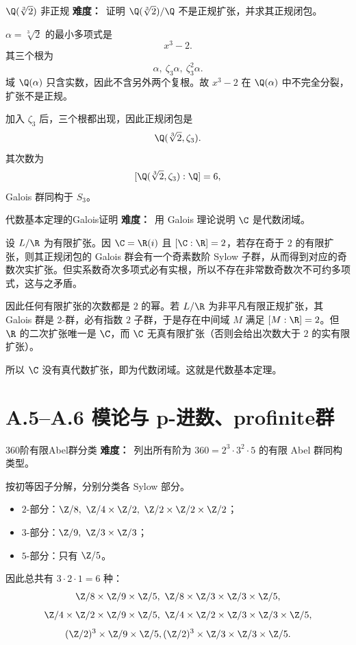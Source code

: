 \begin{problem}{$\Q(\sqrt[3]{2})$ 非正规}
\textbf{难度：}\hard\ 证明 $\Q(\sqrt[3]{2})/\Q$ 不是正规扩张，并求其正规闭包。
\end{problem}
\begin{solution}
$\alpha=\sqrt[3]{2}$ 的最小多项式是
\[
x^3-2.
\]
其三个根为
\[
\alpha,\ \zeta_3\alpha,\ \zeta_3^2\alpha.
\]
域 $\Q(\alpha)$ 只含实数，因此不含另外两个复根。故 $x^3-2$ 在 $\Q(\alpha)$ 中不完全分裂，扩张不是正规。

加入 $\zeta_3$ 后，三个根都出现，因此正规闭包是
\[
\Q(\sqrt[3]{2},\zeta_3).
\]
其次数为
\[
[\Q(\sqrt[3]{2},\zeta_3):\Q]=6,
\]
Galois 群同构于 $S_3$。
\end{solution}

\begin{problem}{代数基本定理的Galois证明}
\textbf{难度：}\hard\ 用 Galois 理论说明 $\C$ 是代数闭域。
\end{problem}
\begin{solution}
设 $L/\R$ 为有限扩张。因 $\C=\R(i)$ 且 $[\C:\R]=2$，若存在奇于 $2$ 的有限扩张，则其正规闭包的 Galois 群会有一个奇素数阶 Sylow 子群，从而得到对应的奇数次实扩张。但实系数奇次多项式必有实根，所以不存在非常数奇数次不可约多项式，这与之矛盾。

因此任何有限扩张的次数都是 $2$ 的幂。若 $L/\R$ 为非平凡有限正规扩张，其 Galois 群是 2-群，必有指数 $2$ 子群，于是存在中间域 $M$ 满足 $[M:\R]=2$。但 $\R$ 的二次扩张唯一是 $\C$，而 $\C$ 无真有限扩张（否则会给出次数大于 $2$ 的实有限扩张）。

所以 $\C$ 没有真代数扩张，即为代数闭域。这就是代数基本定理。
\end{solution}

\section{A.5--A.6 模论与 p-进数、profinite群}

\begin{problem}{360阶有限Abel群分类}
\textbf{难度：}\easy\ 列出所有阶为 $360=2^3\cdot3^2\cdot5$ 的有限 Abel 群同构类型。
\end{problem}
\begin{solution}
按初等因子分解，分别分类各 Sylow 部分。
\begin{itemize}
  \item $2$-部分：$\Z/8,\ \Z/4\times\Z/2,\ \Z/2\times\Z/2\times\Z/2$；
  \item $3$-部分：$\Z/9,\ \Z/3\times\Z/3$；
  \item $5$-部分：只有 $\Z/5$。
\end{itemize}
因此总共有 $3\cdot2\cdot1=6$ 种：
\[
\Z/8\times\Z/9\times\Z/5,
\ \Z/8\times\Z/3\times\Z/3\times\Z/5,
\]
\[
\Z/4\times\Z/2\times\Z/9\times\Z/5,
\ \Z/4\times\Z/2\times\Z/3\times\Z/3\times\Z/5,
\]
\[
(\Z/2)^3\times\Z/9\times\Z/5,
(\Z/2)^3\times\Z/3\times\Z/3\times\Z/5.
\]
\end{solution}

